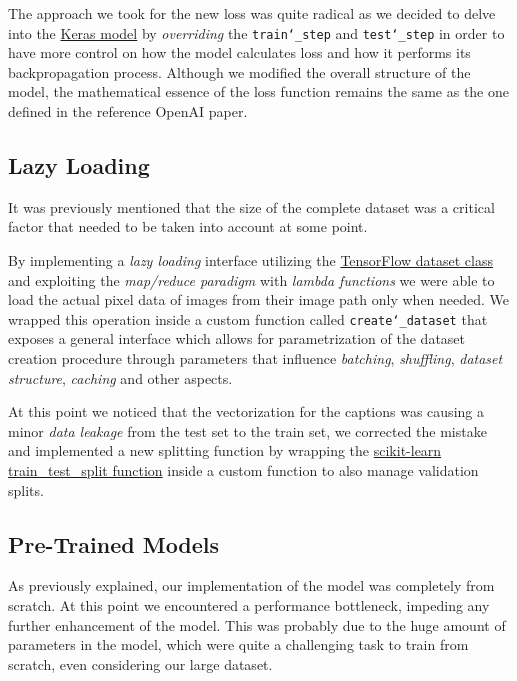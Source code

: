 \documentclass[10pt,twocolumn,letterpaper]{article}
\begin{document}
The approach we took for the new loss was quite radical as we decided to delve into the \href{https://www.tensorflow.org/api_docs/python/tf/keras/Model}{Keras model} by \textit{overriding} the \texttt{train\char`_step} and \texttt{test\char`_step} in order to have more control on how the model calculates loss and how it performs its backpropagation process.
Although we modified the overall structure of the model, the mathematical essence of the loss function remains the same as the one defined in the reference OpenAI paper.

\subsection{Lazy Loading}
It was previously mentioned that the size of the complete dataset was a critical factor that needed to be taken into account at some point.

By implementing a \textit{lazy loading} interface utilizing the \href{https://www.tensorflow.org/api_docs/python/tf/data/Dataset}{TensorFlow dataset class} and exploiting the \textit{map/reduce paradigm} with \textit{lambda functions} we were able to load the actual pixel data of images from their image path only when needed.
We wrapped this operation inside a custom function called \texttt{create\char`_dataset} that exposes a general interface which allows for parametrization of the dataset creation procedure through parameters that influence \textit{batching}, \textit{shuffling}, \textit{dataset structure}, \textit{caching} and other aspects.

At this point we noticed that the vectorization for the captions was causing a minor \textit{data leakage} from the test set to the train set, we corrected the mistake and implemented a new splitting function by wrapping the \href{https://scikit-learn.org/stable/modules/generated/sklearn.model_selection.train_test_split.html}{scikit-learn train\_test\_split function} inside a custom function to also manage validation splits.

\subsection{Pre-Trained Models}
As previously explained, our implementation of the model was completely from scratch. At this point we encountered a performance bottleneck, impeding any further enhancement of the model. This was probably due to the huge amount of parameters in the model, which were quite a challenging task to train from scratch, even considering our large dataset.
\end{document}
